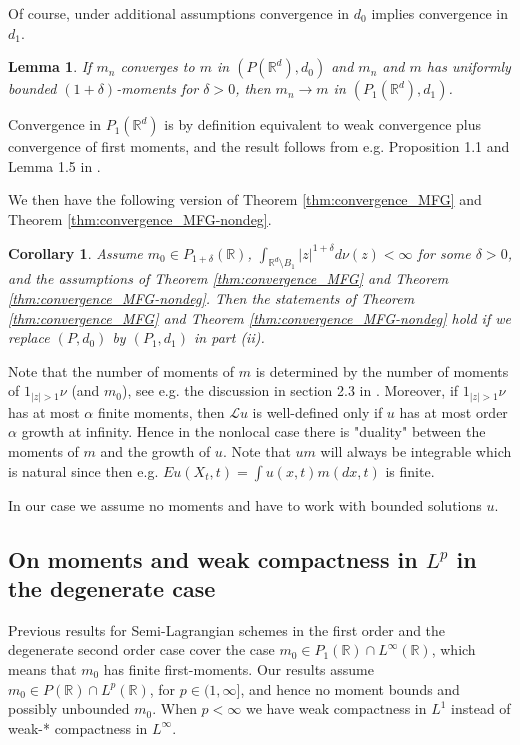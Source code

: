 \documentclass[a4paper,  twoside, 10pt, leqno]{amsart}
\newcommand{\rd}{\mathbb{R}^d}
\newtheorem{corollary}[thm]{Corollary}
\newtheorem{lemma}[thm]{Lemma}
\theoremstyle{remark}
\theoremstyle{definition}
\begin{document}
 Of course, under additional assumptions convergence in $d_0$ implies convergence in $d_1$.

\begin{lemma}
If $m_{n}$ converges to $m$ in $(P ( \rd ),d_0)$ and $m_{n}$ and $m$ has uniformly bounded $(1+\delta)$-moments for $\delta>0$,
then $m_{n} \to m$ in $ ( P_{1} ( \rd ) , d_{1} ) $.
\end{lemma}
Convergence in $P_{1} ( \rd )$ \cite[Definition 6.8]{villani2008optimal} is by definition equivalent to  weak convergence plus convergence of first moments, and the result follows from e.g. Proposition 1.1 and Lemma 1.5 in \cite{ACDPS:Note}.

We then have the following version of Theorem \ref{thm:convergence_MFG} and Theorem \ref{thm:convergence_MFG-nondeg}.
\begin{corollary}
    Assume $m_{0} \in P_{1+\delta} ( \mathbb{R} )$, $\int_{\rd \setminus B_{1}} |z|^{1+\delta} d \nu ( z ) < \infty $ for some $\delta>0$,
    and the assumptions of Theorem \ref{thm:convergence_MFG} and Theorem \ref{thm:convergence_MFG-nondeg}. 
    Then the statements of Theorem \ref{thm:convergence_MFG} and Theorem \ref{thm:convergence_MFG-nondeg}
    hold if we replace $(P,d_0)$ by $(P_{1},d_1)$ in part (ii).
\end{corollary}
Note that the number of moments of $m$ is determined by the number of moments of  $1_{|z|>1}\nu$ (and $m_0$), see e.g. the discussion in section 2.3 in \cite{ersland2020classical}. Moreover, if $1_{|z|>1}\nu$ has at most $\alpha$ finite moments, then $\mathcal Lu$ is well-defined only if $u$ has at most order $\alpha$ growth at infinity. Hence in the nonlocal case there is "duality" between the moments of $m$ and the growth of $u$. Note that $um$ will always be integrable which is natural since then e.g. $Eu(X_t,t) =\int u(x,t)m(dx,t)$ is finite. 

In our case we assume no moments and have to work with bounded solutions $u$.


\subsection*{On moments and weak compactness in $L^p$ in the degenerate case}
Previous results for Semi-Lagrangian schemes in the first order
and the degenerate second order case \cite{carliniSilva2014semi1st, carlini2015semi} 
cover the case $m_{0} \in P_{1} ( \mathbb{R} ) \cap L^{\infty} ( \mathbb{R} )$, 
which means that $m_{0}$ has finite first-moments.
Our results assume
$m_{0} \in P ( \mathbb{R} ) \cap L^{p} ( \mathbb{R} )$, for $p \in ( 1,\infty ]$, and hence
no moment bounds and possibly unbounded $m_{0}$. When $p < \infty$ we
have weak compactness in $L^{1}$ instead of weak-* compactness in $L^{\infty}$. 
\end{document}
